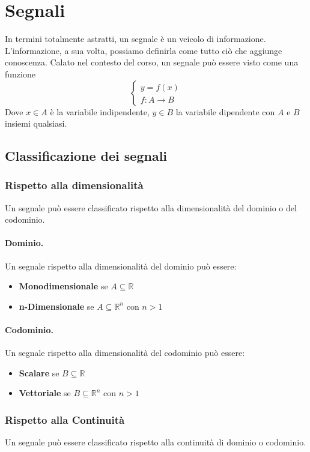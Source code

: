 \section{Segnali}
In termini totalmente astratti, un segnale è un veicolo di informazione. 
L'informazione, a sua volta, possiamo definirla come tutto ciò che aggiunge conoscenza.
Calato nel contesto del corso, un segnale può essere visto come una funzione
\begin{equation*}
    \begin{cases}
        y = f(x)\\
        f : A \longrightarrow B
    \end{cases}
\end{equation*}
Dove $x \in A$ è la variabile indipendente, $y \in B$ la variabile dipendente con $A$ e $B$ insiemi qualsiasi.
\subsection{Classificazione dei segnali}
\subsubsection{Rispetto alla dimensionalità}
Un segnale può essere classificato rispetto alla dimensionalità del dominio o del codominio.
\paragraph{Dominio.} Un segnale rispetto alla dimensionalità del dominio può essere:
\begin{itemize}
    \item \textbf{Monodimensionale} se $A \subseteq \mathbb{R}$
    \item \textbf{n-Dimensionale} se $A \subseteq \mathbb{R}^n$ con $n > 1$
\end{itemize}
\paragraph{Codominio.} Un segnale rispetto alla dimensionalità del codominio può essere:
\begin{itemize}
    \item \textbf{Scalare} se $B \subseteq \mathbb{R}$
    \item \textbf{Vettoriale} se $B \subseteq \mathbb{R}^n$ con $n > 1$
\end{itemize}

\subsubsection{Rispetto alla Continuità}
Un segnale può essere classificato rispetto alla continuità di dominio o codominio.
